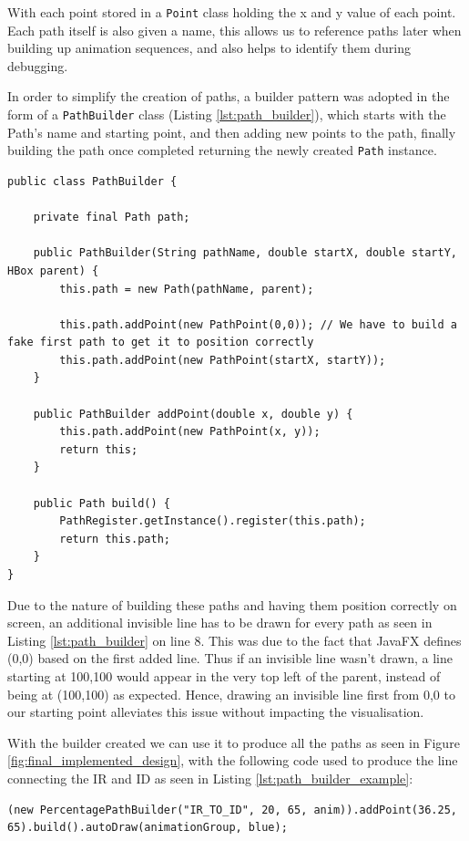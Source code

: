 With each point stored in a \texttt{Point} class holding the x and y value of each point. Each path itself is also given a name, this allows us to reference paths later when building up animation sequences, and also helps to identify them during debugging.

In order to simplify the creation of paths, a builder pattern was adopted in the form of a \texttt{PathBuilder} class (Listing \ref{lst:path_builder}), which starts with the Path's name and starting point, and then adding new points to the path, finally building the path once completed returning the newly created \texttt{Path} instance.

\begin{lstlisting}[caption=Path Builder, label=lst:path_builder]
public class PathBuilder {

    private final Path path;

    public PathBuilder(String pathName, double startX, double startY, HBox parent) {
        this.path = new Path(pathName, parent);

        this.path.addPoint(new PathPoint(0,0)); // We have to build a fake first path to get it to position correctly
        this.path.addPoint(new PathPoint(startX, startY));
    }

    public PathBuilder addPoint(double x, double y) {
        this.path.addPoint(new PathPoint(x, y));
        return this;
    }
    
    public Path build() {
        PathRegister.getInstance().register(this.path);
        return this.path;
    }
}
\end{lstlisting}

Due to the nature of building these paths and having them position correctly on screen, an additional invisible line has to be drawn for every path as seen in Listing \ref{lst:path_builder} on line 8. This was due to the fact that JavaFX \cite{sunmicrosystems_2022_javafx} defines (0,0) based on the first added line. Thus if an invisible line wasn't drawn, a line starting at 100,100 would appear in the very top left of the parent, instead of being at (100,100) as expected. Hence, drawing an invisible line first from 0,0 to our starting point alleviates this issue without impacting the visualisation.

With the builder created we can use it to produce all the paths as seen in Figure \ref{fig:final_implemented_design}, with the following code used to produce the line connecting the \ac{IR} and \ac{ID} as seen in Listing \ref{lst:path_builder_example}:
\begin{lstlisting}[caption=Example of use the path builder, label=lst:path_builder_example]
(new PercentagePathBuilder("IR_TO_ID", 20, 65, anim)).addPoint(36.25, 65).build().autoDraw(animationGroup, blue);
\end{lstlisting}

